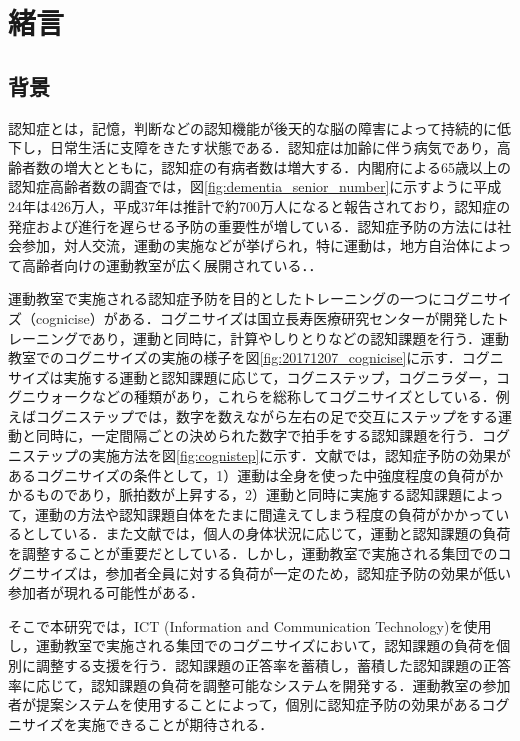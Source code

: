 \chapter{緒言}
\thispagestyle{myheadings}

\section{背景}
認知症とは，記憶，判断などの認知機能が後天的な脳の障害によって持続的に低下し，日常生活に支障をきたす状態である\cite{認知症とは}．認知症は加齢に伴う病気であり，高齢者数の増大とともに，認知症の有病者数は増大する\cite{認知症予防マニュアル}．内閣府による65歳以上の認知症高齢者数の調査\cite{高齢社会白書}では，図\ref{fig:dementia_senior_number}に示すように平成24年は426万人，平成37年は推計で約700万人になると報告されており，認知症の発症および進行を遅らせる予防の重要性が増している\cite{新オレンジプラン}．認知症予防の方法には社会参加，対人交流，運動の実施などが挙げられ\cite{運動の効果}，特に運動は，地方自治体によって高齢者向けの運動教室が広く展開されている．\cite{運動教室}．

運動教室で実施される認知症予防を目的としたトレーニングの一つにコグニサイズ（cognicise）がある\cite{コグニサイズとは}．コグニサイズは国立長寿医療研究センター\cite{国立長寿医療研究センター}が開発したトレーニングであり，運動と同時に，計算やしりとりなどの認知課題を行う．運動教室でのコグニサイズの実施の様子を図\ref{fig:20171207_cognicise}に示す．コグニサイズは実施する運動と認知課題に応じて，コグニステップ，コグニラダー，コグニウォークなどの種類があり，これらを総称してコグニサイズとしている\cite{認知症予防へ向けた運動コグニサイズ}．例えばコグニステップでは，数字を数えながら左右の足で交互にステップをする運動と同時に，一定間隔ごとの決められた数字で拍手をする認知課題を行う．コグニステップの実施方法を図\ref{fig:cognistep}に示す．文献\cite{コグニサイズとは}では，認知症予防の効果があるコグニサイズの条件として，1）運動は全身を使った中強度程度の負荷がかかるものであり，脈拍数が上昇する，2）運動と同時に実施する認知課題によって，運動の方法や認知課題自体をたまに間違えてしまう程度の負荷がかかっているとしている．また文献\cite{認知症予防へ向けた運動コグニサイズ}では，個人の身体状況に応じて，運動と認知課題の負荷を調整することが重要だとしている．しかし，運動教室で実施される集団でのコグニサイズは，参加者全員に対する負荷が一定のため，認知症予防の効果が低い参加者が現れる可能性がある\cite{運動教室の効果}．

そこで本研究では，ICT (Information and Communication Technology)を使用し，運動教室で実施される集団でのコグニサイズにおいて，認知課題の負荷を個別に調整する支援を行う．認知課題の正答率を蓄積し，蓄積した認知課題の正答率に応じて，認知課題の負荷を調整可能なシステムを開発する．運動教室の参加者が提案システムを使用することによって，個別に認知症予防の効果があるコグニサイズを実施できることが期待される．

